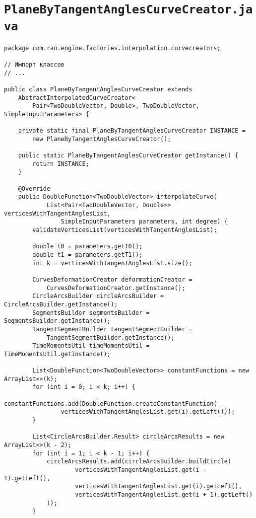 \section*{\texttt{PlaneByTangentAnglesCurveCreator.java}}
\begin{verbatim}
package com.ran.engine.factories.interpolation.curvecreators;

// Импорт классов
// ...

public class PlaneByTangentAnglesCurveCreator extends
    AbstractInterpolatedCurveCreator<
        Pair<TwoDoubleVector, Double>, TwoDoubleVector, SimpleInputParameters> {

    private static final PlaneByTangentAnglesCurveCreator INSTANCE =
        new PlaneByTangentAnglesCurveCreator();

    public static PlaneByTangentAnglesCurveCreator getInstance() {
        return INSTANCE;
    }

    @Override
    public DoubleFunction<TwoDoubleVector> interpolateCurve(
            List<Pair<TwoDoubleVector, Double>> verticesWithTangentAnglesList,
                SimpleInputParameters parameters, int degree) {
        validateVerticesList(verticesWithTangentAnglesList);

        double t0 = parameters.getT0();
        double t1 = parameters.getT1();
        int k = verticesWithTangentAnglesList.size();

        CurvesDeformationCreator deformationCreator =
            CurvesDeformationCreator.getInstance();
        CircleArcsBuilder circleArcsBuilder = CircleArcsBuilder.getInstance();
        SegmentsBuilder segmentsBuilder = SegmentsBuilder.getInstance();
        TangentSegmentBuilder tangentSegmentBuilder =
            TangentSegmentBuilder.getInstance();
        TimeMomentsUtil timeMomentsUtil = TimeMomentsUtil.getInstance();

        List<DoubleFunction<TwoDoubleVector>> constantFunctions = new ArrayList<>(k);
        for (int i = 0; i < k; i++) {
            constantFunctions.add(DoubleFunction.createConstantFunction(
                verticesWithTangentAnglesList.get(i).getLeft()));
        }

        List<CircleArcsBuilder.Result> circleArcsResults = new ArrayList<>(k - 2);
        for (int i = 1; i < k - 1; i++) {
            circleArcsResults.add(circleArcsBuilder.buildCircle(
                    verticesWithTangentAnglesList.get(i - 1).getLeft(),
                    verticesWithTangentAnglesList.get(i).getLeft(),
                    verticesWithTangentAnglesList.get(i + 1).getLeft()
            ));
        }


\end{verbatim}
